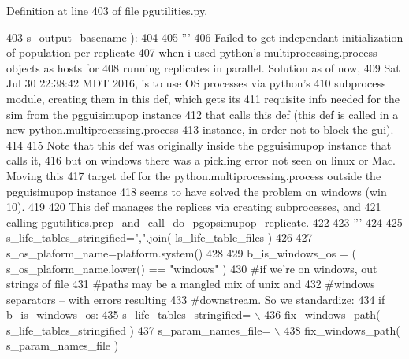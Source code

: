 Definition at line 403 of file pgutilities.\+py.


\begin{DoxyCode}
403             s\_output\_basename ):
404 
405     \textcolor{stringliteral}{'''}
406 \textcolor{stringliteral}{    Failed to get independant initialization of population per-replicate}
407 \textcolor{stringliteral}{    when i used python's multiprocessing.process objects as hosts for }
408 \textcolor{stringliteral}{    running replicates in parallel.  Solution as of now, }
409 \textcolor{stringliteral}{    Sat Jul 30 22:38:42 MDT 2016, is to use OS processes via python's }
410 \textcolor{stringliteral}{    subprocess module, creating them in this def, which gets its}
411 \textcolor{stringliteral}{    requisite info needed for the sim from the pgguisimupop instance}
412 \textcolor{stringliteral}{    that calls this def (this def is called in a new python.multiprocessing.process}
413 \textcolor{stringliteral}{    instance, in order not to block the gui).}
414 \textcolor{stringliteral}{}
415 \textcolor{stringliteral}{    Note that this def was originally inside the pgguisimupop instance that calls it,}
416 \textcolor{stringliteral}{    but on windows there was a pickling error not seen on linux or Mac.  Moving this}
417 \textcolor{stringliteral}{    target def for the python.multiprocessing.process outside the pgguisimupop instance}
418 \textcolor{stringliteral}{    seems to have solved the problem on windows (win 10).}
419 \textcolor{stringliteral}{}
420 \textcolor{stringliteral}{    This def manages the replices via creating subprocesses, and }
421 \textcolor{stringliteral}{    calling pgutilities.prep\_and\_call\_do\_pgopsimupop\_replicate.}
422 \textcolor{stringliteral}{}
423 \textcolor{stringliteral}{    '''} 
424 
425     s\_life\_tables\_stringified=\textcolor{stringliteral}{","}.join( ls\_life\_table\_files )
426 
427     s\_os\_plaform\_name=platform.system()
428 
429     b\_is\_windows\_os = ( s\_os\_plaform\_name.lower() == \textcolor{stringliteral}{"windows"} )
430     \textcolor{comment}{#if we're on windows, out strings of file}
431     \textcolor{comment}{#paths may be a mangled mix of unix and }
432     \textcolor{comment}{#windows separators -- with errors resulting}
433     \textcolor{comment}{#downstream.  So we standardize:}
434     \textcolor{keywordflow}{if} b\_is\_windows\_os:
435         s\_life\_tables\_stringified= \(\backslash\)
436             fix\_windows\_path( s\_life\_tables\_stringified )
437         s\_param\_names\_file= \(\backslash\)
438             fix\_windows\_path( s\_param\_names\_file )              

\end{DoxyCode}
